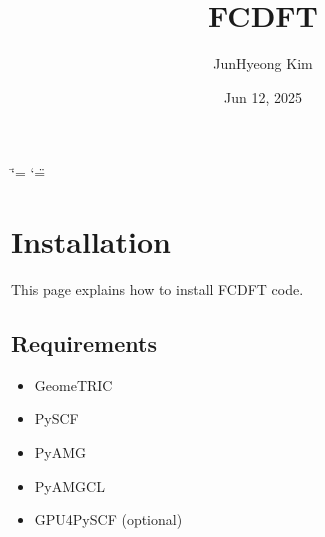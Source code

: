 \documentclass[letterpaper,10pt,english]{sphinxmanual}
\title{FC\sphinxhyphen{}DFT}
\date{Jun 12, 2025}
\author{Jun\sphinxhyphen{}Hyeong Kim}
\begin{document}
\ifdefined\shorthandoff
  \ifnum\catcode`\=\string=\active\shorthandoff{=}\fi
  \ifnum\catcode`\"=\active{}\fi
\fi

\pagestyle{empty}
\sphinxmaketitle
\pagestyle{plain}
\sphinxtableofcontents
\pagestyle{normal}
\label{\detokenize{index::doc}}


\sphinxstepscope


\chapter{Installation}
\label{\detokenize{install:installation}}\label{\detokenize{install::doc}}
\sphinxAtStartPar
This page explains how to install FC\sphinxhyphen{}DFT code.


\section{Requirements}
\label{\detokenize{install:requirements}}\begin{itemize}
\item {} 
\sphinxAtStartPar
GeomeTRIC

\item {} 
\sphinxAtStartPar
PySCF

\item {} 
\sphinxAtStartPar
PyAMG

\item {} 
\sphinxAtStartPar
PyAMGCL

\item {} 
\sphinxAtStartPar
GPU4PySCF (optional)

\end{itemize}
\end{document}
